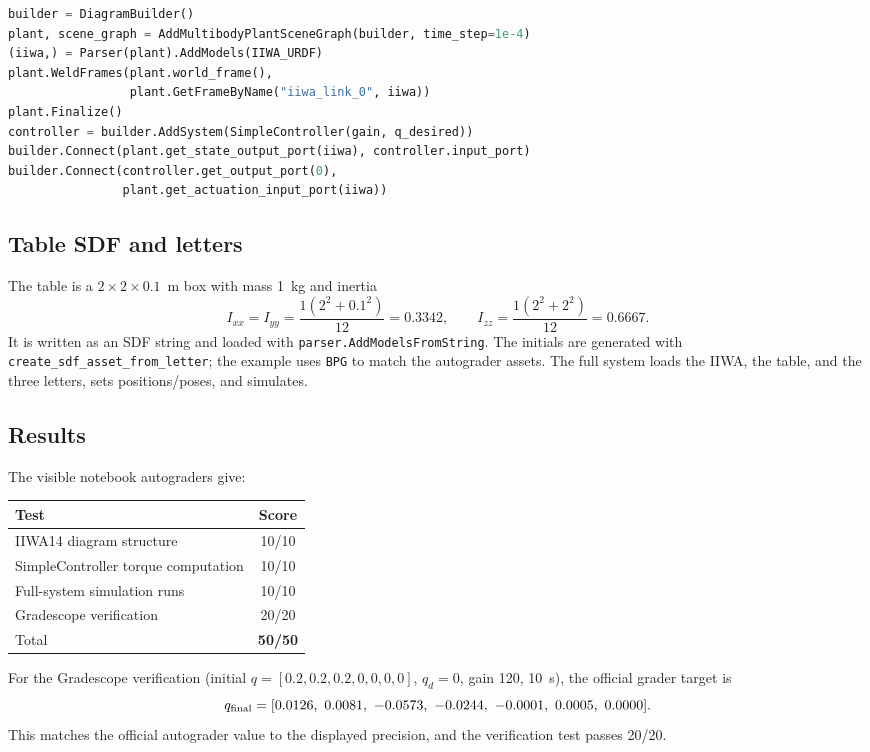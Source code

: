 \documentclass[11pt]{article}
\begin{document}
\begin{lstlisting}[language=Python,caption={IIWA14 diagram and controller wiring.}]
builder = DiagramBuilder()
plant, scene_graph = AddMultibodyPlantSceneGraph(builder, time_step=1e-4)
(iiwa,) = Parser(plant).AddModels(IIWA_URDF)
plant.WeldFrames(plant.world_frame(),
                 plant.GetFrameByName("iiwa_link_0", iiwa))
plant.Finalize()
controller = builder.AddSystem(SimpleController(gain, q_desired))
builder.Connect(plant.get_state_output_port(iiwa), controller.input_port)
builder.Connect(controller.get_output_port(0),
                plant.get_actuation_input_port(iiwa))
\end{lstlisting}

\subsection{Table SDF and letters}

The table is a $2\times2\times0.1$~m box with mass 1~kg and inertia
\[
I_{xx}=I_{yy}=\frac{1(2^2+0.1^2)}{12}=0.3342,\qquad
I_{zz}=\frac{1(2^2+2^2)}{12}=0.6667.
\]
It is written as an SDF string and loaded with
\texttt{parser.AddModelsFromString}.  The initials are generated with
\texttt{create\_sdf\_asset\_from\_letter}; the example uses \texttt{BPG} to
match the autograder assets.  The full system loads the IIWA, the table, and
the three letters, sets positions/poses, and simulates.

\subsection{Results}

The visible notebook autograders give:
\begin{center}
\begin{tabular}{lc}
\toprule
Test & Score \\
\midrule
IIWA14 diagram structure & 10/10 \\
SimpleController torque computation & 10/10 \\
Full-system simulation runs & 10/10 \\
Gradescope verification & 20/20 \\
\midrule
Total & \textbf{50/50} \\
\bottomrule
\end{tabular}
\end{center}

For the Gradescope verification (initial $q=[0.2,0.2,0.2,0,0,0,0]$,
$q_d=0$, gain 120, 10~s), the official grader target is
\[
q_{\rm final}=[0.0126,\ 0.0081,\ -0.0573,\ -0.0244,\
-0.0001,\ 0.0005,\ 0.0000].
\]
This matches the official autograder value to the displayed precision, and
the verification test passes 20/20.
\end{document}
